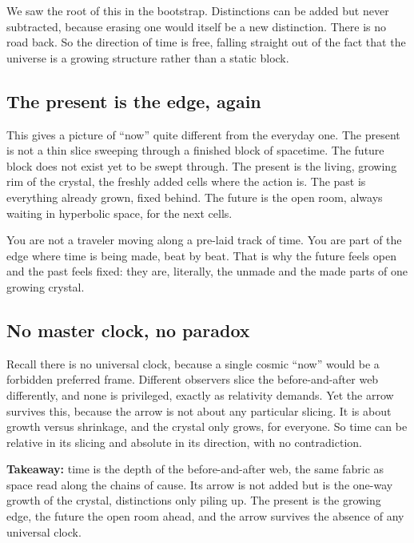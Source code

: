 We saw the root of this in the bootstrap. Distinctions can be added but never subtracted, because erasing one would itself be a new distinction. There is no road back. So the direction of time is free, falling straight out of the fact that the universe is a growing structure rather than a static block.

\subsection{The present is the edge, again}

This gives a picture of ``now'' quite different from the everyday one. The present is not a thin slice sweeping through a finished block of spacetime. The future block does not exist yet to be swept through. The present is the living, growing rim of the crystal, the freshly added cells where the action is. The past is everything already grown, fixed behind. The future is the open room, always waiting in hyperbolic space, for the next cells.

You are not a traveler moving along a pre-laid track of time. You are part of the edge where time is being made, beat by beat. That is why the future feels open and the past feels fixed: they are, literally, the unmade and the made parts of one growing crystal.

\subsection{No master clock, no paradox}

Recall there is no universal clock, because a single cosmic ``now'' would be a forbidden preferred frame. Different observers slice the before-and-after web differently, and none is privileged, exactly as relativity demands. Yet the arrow survives this, because the arrow is not about any particular slicing. It is about growth versus shrinkage, and the crystal only grows, for everyone. So time can be relative in its slicing and absolute in its direction, with no contradiction.

\textbf{Takeaway:} time is the depth of the before-and-after web, the same fabric as space read along the chains of cause. Its arrow is not added but is the one-way growth of the crystal, distinctions only piling up. The present is the growing edge, the future the open room ahead, and the arrow survives the absence of any universal clock.
